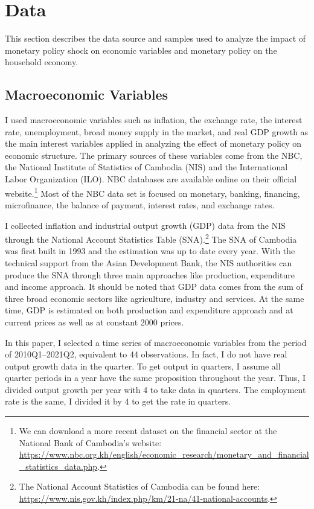 \documentclass[11pt,letterpaper]{article}
\begin{document}
\section{Data}\label{sec:data}

This section describes the data source and samples used to analyze the impact of monetary policy shock on economic variables and monetary policy on the household economy.   

\subsection{Macroeconomic Variables}	

I used macroeconomic variables such as inflation, the exchange rate, the interest rate, unemployment, broad money supply in the market, and real GDP growth as the main interest variables applied in analyzing the effect of monetary policy on economic structure. The primary sources of these variables come from the NBC, the National Institute of Statistics of Cambodia (NIS) and the International Labor Organization (ILO). NBC databases are available online on their official website.\footnote{We can download a more recent dataset on the financial sector at the National Bank of Cambodia’s website: \url{https://www.nbc.org.kh/english/economic_research/monetary_and_financial_statistics_data.php}.} Most of the NBC data set is focused on monetary, banking, financing, microfinance, the balance of payment, interest rates, and exchange rates. 

I collected inflation and industrial output growth (GDP) data from the NIS through the National Account Statistics Table (SNA).\footnote{The National Account Statistics of Cambodia can be found here: \url{https://www.nis.gov.kh/index.php/km/21-na/41-national-accounts}.} The SNA of Cambodia was first built in 1993 and the estimation was up to date every year. With the technical support from the Asian Development Bank, the NIS authorities can produce the SNA through three main approaches like production, expenditure and income approach. It should be noted that GDP data comes from the sum of three broad economic sectors like agriculture, industry and services. At the same time, GDP is estimated on both production and expenditure approach and at current prices as well as at constant 2000 prices. 

In this paper, I selected a time series of macroeconomic variables from the period of 2010Q1--2021Q2, equivalent to 44 observations. In fact, I do not have real output growth data in the quarter. To get output in quarters, I assume all quarter periods in a year have the same proposition throughout the year. Thus, I divided output growth per year with 4 to take data in quarters. The employment rate is the same, I divided it by 4 to get the rate in quarters. 
\end{document}

